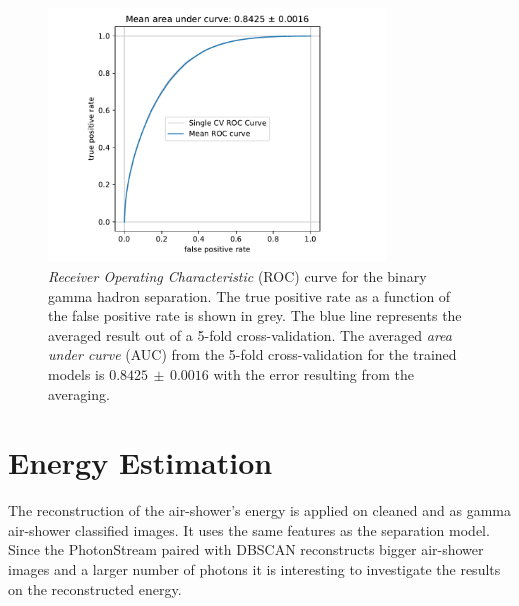 \begin{figure}
  \centering
  \includegraphics[width=0.8\textwidth, page=1]{Plots/results/DBSCAN/separation_performance.pdf}
  \caption{\textit{Receiver Operating Characteristic} (ROC) curve for the binary gamma hadron separation. The true positive rate as a function of the false positive rate is shown in grey. The blue line represents the averaged result out of a 5-fold cross-validation. The averaged \textit{area under curve} (AUC) from the 5-fold cross-validation for the trained models is $0.8425\,\pm\,0.0016$ with the error resulting from the averaging.}
  \label{fig:sep_auc}
\end{figure}
%
%
%
\section{Energy Estimation}
%
The reconstruction of the air-shower's energy is applied on cleaned and as
gamma air-shower classified images. It uses the same features as the separation
model. Since the PhotonStream paired with DBSCAN reconstructs bigger air-shower
images and a larger number of photons it is interesting to investigate the
results on the reconstructed energy.

